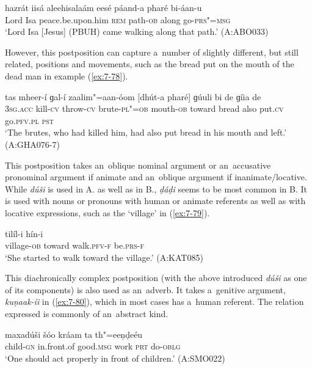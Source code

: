 \begin{exe}
\ex
\label{ex:7-77}
\gll hazrát iisá aleehisalaám eesé páand-a pharé bi-áan-u \\
Lord Isa peace.be.upon.him \textsc{rem} path-\textsc{ob} along go-\textsc{prs"=msg} \\
\glt `Lord Isa [Jesus] (PBUH) came walking along that path.' (A:ABO033)
\end{exe}

However, this postposition can capture a~number of slightly different, but still related, positions and movements, such as the bread put on the mouth of the dead man in example (\ref{ex:7-78}). 

\begin{exe}
\ex
\label{ex:7-78}
\gll tas mheer-í ɡal-í zaalim"=aan-óom [dhút-a pharé] ɡúuli bi de ɡíia de \\
\textsc{3sg.acc} kill-\textsc{cv} throw-\textsc{cv} brute-\textsc{pl"=ob} mouth-\textsc{ob} toward bread also put.\textsc{cv} go.\textsc{pfv.pl} \textsc{pst} \\
\glt `The brutes, who had killed him, had also put bread in his mouth and left.' (A:GHA076-7)
\end{exe}

 This postposition takes an~oblique nominal argument or an~accusative pronominal argument if animate and an~oblique argument if inanimate/locative. While \textit{dúši} is used in A. as well as in B., \textit{ḍáḍi} seems to be most common in B. It is used with nouns or pronouns with human or animate referents as well as with locative expressions, such as the `village' in (\ref{ex:7-79}). 

\begin{exe}
\ex
\label{ex:7-79}
 tilíl-i hín-i \\
village-\textsc{ob} toward walk.\textsc{pfv-f} be.\textsc{prs-f} \\
\glt `She started to walk toward the village.' (A:KAT085)
\end{exe}

 This diachronically complex postposition (with the above introduced \textit{dúši} as one of its components) is also used as an~adverb. It takes a~genitive argument, \textit{kuṇaak-íi} in (\ref{ex:7-80}), which in most cases has a~human referent. The relation expressed is commonly of an~abstract kind.

\begin{exe}
\ex
\label{ex:7-80}
\gll [kuṇaak-íi] maxadúši šóo kráam ta th"=eeṇḍeéu \\
child-\textsc{gn}  in.front.of good.\textsc{msg} work \textsc{prt} do-\textsc{oblg} \\
\glt `One should act properly in front of children.' (A:SMO022)
\end{exe}

